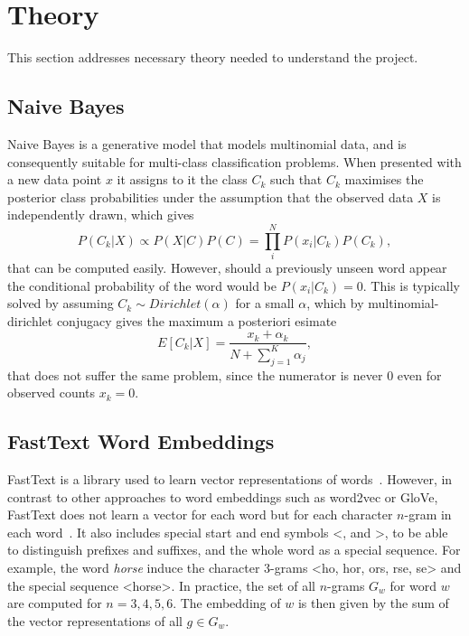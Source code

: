 \chapter{Theory}
This section addresses necessary theory needed to understand the project.

\section{Naive Bayes}
Naive Bayes is a generative model that models multinomial data, and is consequently suitable for multi-class classification problems. When presented with a new data point $x$ it assigns to it the class $C_k$ such that $C_k$ maximises the posterior class probabilities under the assumption that the observed data $X$ is independently drawn, which gives
\begin{equation}
    P(C_k | X) \propto P(X | C)P(C) = \prod_{i}^{N}P(x_{i}|C_{k})P(C_{k}), 
\end{equation}
that can be computed easily. However, should a previously unseen word
appear the conditional probability of the word would be
$P(x_i|C_k)=0$. This is typically solved by assuming $C_{k} \sim
Dirichlet(\alpha)$ for a small $\alpha$, which by
multinomial-dirichlet conjugacy gives the maximum a posteriori esimate
\begin{equation}
  E[C_{k} | X] = \frac{x_{k}+ \alpha_{k}}{N + \sum_{j=1}^{K}\alpha_{j}},
\end{equation}
that does not suffer the same problem, since the numerator is never $0$ even for observed counts $x_{k} = 0$.

\section{FastText Word Embeddings}
FastText is a library used to learn vector representations of
words~\cite{Mikolov2013Jan}. However, in contrast to other
approaches to word embeddings such as word2vec or GloVe, FastText does not learn a vector for each
word but for each character $n$-gram in each
word~\cite{Bojanowski2016Jul}. It also includes special start and end
symbols <, and >, to be able to distinguish prefixes and suffixes, and
the whole word as a special sequence. For example, the word
\textit{horse} induce the character 3-grams <ho, hor, ors, rse, se>
and the special sequence <horse>. In practice, the set of all
$n$-grams $G_w$ for word $w$ are computed for $n = 3, 4, 5, 6$. The embedding of
$w$ is then given by the sum of the vector representations of all
$g \in G_w$.

